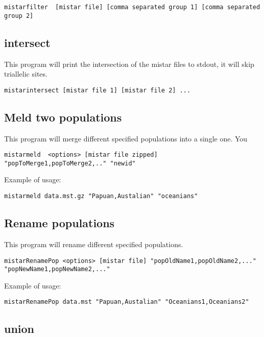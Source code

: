 \documentclass[a4paper]{article}
\begin{document}
\small
\begin{verbatim}
mistarfilter  [mistar file] [comma separated group 1] [comma separated group 2]
\end{verbatim}
\normalsize




\subsection{intersect}

This program will print the intersection of the mistar files to stdout, it will skip triallelic sites.

\begin{verbatim}
mistarintersect [mistar file 1] [mistar file 2] ...
\end{verbatim}

\subsection{Meld two populations}

This program will merge different specified populations into a single one. You 

\small
\begin{verbatim}
mistarmeld  <options> [mistar file zipped] "popToMerge1,popToMerge2,.." "newid"
\end{verbatim}
\normalsize

Example of usage:
\begin{verbatim}
mistarmeld data.mst.gz "Papuan,Austalian" "oceanians"
\end{verbatim}


\subsection{Rename populations}

This program will rename different specified populations.

\small
\begin{verbatim}
mistarRenamePop <options> [mistar file] "popOldName1,popOldName2,..." "popNewName1,popNewName2,..."
\end{verbatim}
\normalsize

Example of usage:
\begin{verbatim}
mistarRenamePop data.mst "Papuan,Austalian" "Oceanians1,Oceanians2"
\end{verbatim}

\subsection{union}
\end{document}
